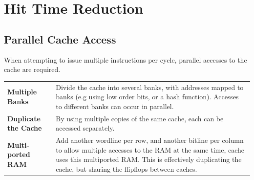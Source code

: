 \section{Hit Time Reduction}

\subsection{Parallel Cache Access}
When attempting to issue multiple instructions per cycle, parallel accesses to the cache are required.
\begin{center}
	\begin{tabular}{p{} p{}}
		\textbf{Multiple Banks}      & Divide the cache into several banks, with addresses mapped to banks (e.g using low order bits, or a hash function). Accesses to different banks can occur in parallel.                                                                     \\
		\textbf{Duplicate the Cache} & By using multiple copies of the same cache, each can be accessed separately.                                                                                                                                                               \\
		\textbf{Multi-ported RAM}    & Add another wordline per row, and another bitline per column to allow multiple accesses to the RAM at the same time, cache uses this multiported RAM. This is effectively duplicating the cache, but sharing the flipflops between caches. \\
	\end{tabular}
\end{center}


